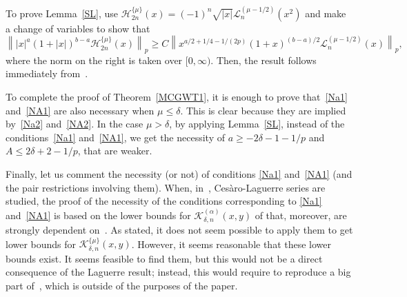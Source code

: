 \documentclass{amsart}
\theoremstyle{plain}
\theoremstyle{definition}
\theoremstyle{remark}
\newcommand{\cheker}[5]{\mathcal{K}_{#1,#2}^{\{#3\}}%
  (#4,#5)} %
\newcommand{\claker}[5]{\mathcal{K}_{#1,#2}^{(#3)}%
  (#4,#5)} %
\newcommand{\herfun}[2]{\mathcal{H}_{#1}^{\{#2\}}}
\newcommand{\lagfun}[2]{\mathcal{L}_{#1}^{(#2)}}
\begin{document}
To prove Lemma~\ref{SL}, use
$\herfun{2n}{\mu}(x) = (-1)^n\sqrt{|x|}\lagfun{n}{\mu-1/2}(x^2)$ and
make a change of variables to show that
\[
  \left\||x|^a(1+|x|)^{b-a}\herfun{2n}{\mu}(x)\right\|_p
  \ge C\left\| x^{a/2+1/4-1/(2p)}(1+x)^{(b-a)/2}
    \lagfun{n}{\mu-1/2}(x) \right\|_p,
\]
where the norm on the right is taken over $[0,\infty)$. Then, the result
follows immediately from~\cite[Lemma~(7.2), p.~1142]{MW}.

To complete the proof of Theorem~\ref{MCGWT1}, it is enough to prove that~\eqref{Na1}
and~\eqref{NA1} are also necessary when $\mu\le\delta$. This is clear because they are
implied by~\eqref{Na2} and~\eqref{NA2}. In the case $\mu>\delta$, by applying
Lemma~\ref{SL}, instead of the conditions~\eqref{Na1} and~\eqref{NA1}, we get the
necessity of $a \ge -2\delta-1-1/p$ and $A \le 2\delta+2-1/p$, that are weaker.

Finally, let us comment the necessity (or not) of conditions \eqref{Na1} and~\eqref{NA1} (and the
pair restrictions involving them). When, in~\cite{MW2}, Ces\`aro-Laguerre series are studied, the
proof of the necessity of the conditions corresponding to \eqref{Na1} and~\eqref{NA1} is based on
the lower bounds for $\claker{\delta}{n}{\alpha}{x}{y}$ of \cite[Lemma~(8.1)]{MW} that, moreover,
are strongly dependent on~\cite{W}. As stated, it does not seem possible to apply them to
get lower bounds for $\cheker{\delta}{n}{\mu}{x}{y}$. However, it seems reasonable that these lower
bounds exist. It seems feasible to find them, but this would not be a direct consequence of the
Laguerre result; instead, this would require to reproduce a big part of~\cite{W,MW}, which is
outside of the purposes of the paper.

\end{document}
